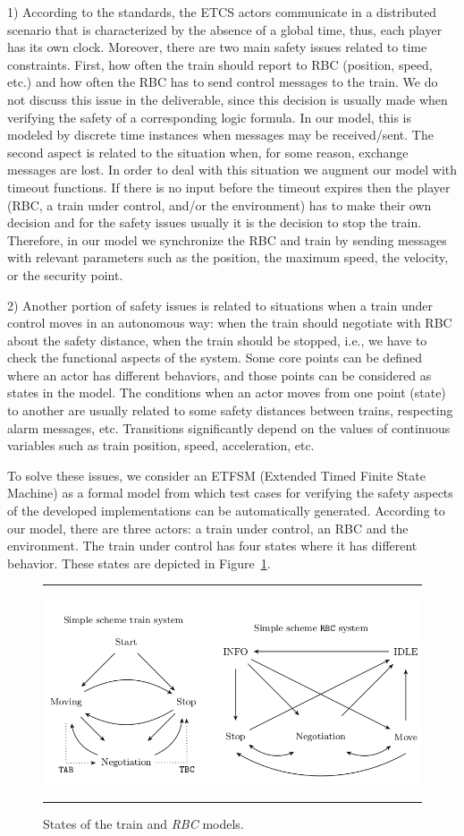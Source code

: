 \documentclass{template/openetcs_article}
\begin{document}
1) According to the standards, the ETCS actors communicate in a distributed scenario that is characterized by the absence of a global time, thus, each player has its own clock. Moreover, there are two main safety issues related to time constraints. First, how often the train should report to RBC (position, speed, etc.) and how often the RBC has to send control messages to the train. We do not discuss this issue in the deliverable, since this decision is usually made when verifying the safety of a corresponding logic formula. In our model, this is modeled by discrete time instances when messages may be received/sent. The second aspect is related to the situation when, for some reason, exchange messages are lost. In order to deal with this situation we augment our model with timeout functions. If there is no input before the timeout expires then the player (RBC, a train under control, and/or the environment) has to make their own decision and for the safety issues usually it is the decision to stop the train. Therefore, in our model we synchronize the RBC and train by sending messages with relevant parameters such as the position, the maximum speed, the velocity, or the security point. 

2) Another portion of safety issues is related to situations when a train under control moves in an autonomous way: when the train should negotiate with RBC about the safety distance, when the train should be stopped, i.e., we have to check the functional aspects of the system. Some core points can be defined where an actor has different behaviors, and those points can be considered as states in the model. The conditions when an actor moves from one point (state) to another are usually related to some safety distances between trains, respecting alarm messages, etc. Transitions significantly depend on the values of continuous variables such as train position, speed, acceleration, etc. 

To solve these issues, we consider an ETFSM (Extended Timed Finite State Machine) as a formal model from which test cases for verifying the safety aspects of the developed implementations can be automatically generated. According to our model, there are three actors: a train under control, an RBC and the environment. The train under control has four states where it has different behavior. These states are depicted in Figure~\ref{fig:states}. 

\begin{figure}[t]
\hrule
\sspace
\centering
  \includegraphics[width=.9\textwidth]{figures/ETCSStates.png}
  \caption{States of the train and \textit{RBC} models.}
  \label{fig:states}
\sspace
\hrule
\end{figure}
\end{document}
